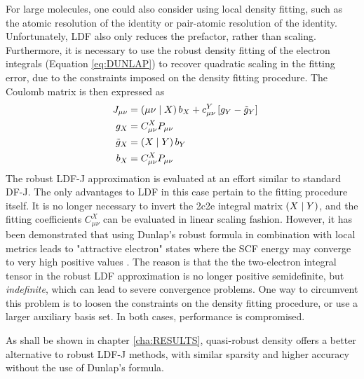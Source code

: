 For large molecules, one could also consider using local density fitting, such as the atomic resolution of the identity or pair-atomic resolution of the identity. Unfortunately, LDF also only reduces the prefactor, rather than scaling. Furthermore, it is necessary to use the robust density fitting of the electron integrals (Equation \ref{eq:DUNLAP}) to recover quadratic scaling in the fitting error, due to the constraints imposed on the density fitting procedure. The Coulomb matrix is then expressed as
\begin{align}
J_{\mu\nu} &= \left( \mu\nu \mid X \right) b_X + c^Y_{\mu\nu} \left[ g_Y - \tilde{g}_Y \right] \\
g_X &= C^X_{\mu\nu} P_{\mu\nu} \\
\tilde{g}_X &= \left( X \mid Y \right) b_{Y} \\ 
\quad b_{X} &= C_{\mu\nu}^{X} P_{\mu\nu} 
\end{align}
\noindent The robust LDF-J approximation is evaluated at an effort similar to standard DF-J. The only advantages to LDF in this case pertain to the fitting procedure itself. It is no longer necessary to invert the 2c2e integral matrix $\left( X \mid Y \right)$, and the fitting coefficients $C_{\mu\nu}^{X}$ can be evaluated in linear scaling fashion. However, it has been demonstrated that using Dunlap's robust formula in combination with local metrics leads to "attractive electron" states where the SCF energy may converge to very high positive values \cite{Mer2013,Hol2014}. The reason is that the the two-electron integral tensor in the robust LDF approximation is no longer positive semidefinite, but \emph{indefinite}, which can lead to severe convergence problems. One way to circumvent this problem is to loosen the constraints on the density fitting procedure, or use a larger auxiliary basis set. In both cases, performance is compromised.  

As shall be shown in chapter \ref{cha:RESULTS}, quasi-robust density offers a better alternative to robust LDF-J methods, with similar sparsity and higher accuracy without the use of Dunlap's formula.




